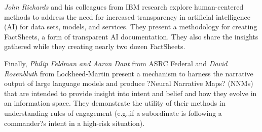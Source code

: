 \documentclass[11pt]{article}
\begin{document}
\textit{John Richards} and his colleagues from IBM research explore  human-centered methods to address the need for increased transparency in artificial intelligence (AI) for data sets, models, and services. They present a methodology for creating FactSheets, a form of transparent AI documentation. They also share the insights gathered while they creating nearly two dozen FactSheets.    

Finally, \textit{Philip Feldman and Aaron Dant} from ASRC Federal and \textit{David Rosenbluth} from Lockheed-Martin present a mechanism to harness the narrative output of large language models and produce ?Neural Narrative Maps? (NNMs) that are intended to provide insight into intent and belief and how they evolve in an information space. They demonstrate the utility of their methods in understanding rules of engagement (e.g.,if a subordinate is following a commander?s intent in a high-risk situation).  

\end{document}
